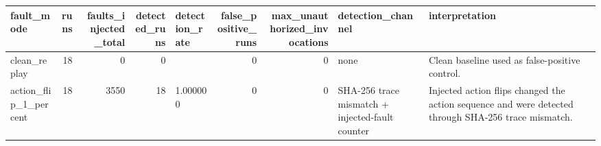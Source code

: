\begin{tabular}{lrrrlrrll}
\toprule
fault\_mode & runs & faults\_injected\_total & detected\_runs & detection\_rate & false\_positive\_runs & max\_unauthorized\_invocations & detection\_channel & interpretation \\
\midrule
clean\_replay & 18 & 0 & 0 &  & 0 & 0 & none & Clean baseline used as false-positive control. \\
action\_flip\_1\_percent & 18 & 3550 & 18 & 1.000000 & 0 & 0 & SHA-256 trace mismatch + injected-fault counter & Injected action flips changed the action sequence and were detected through SHA-256 trace mismatch. \\
\bottomrule
\end{tabular}
